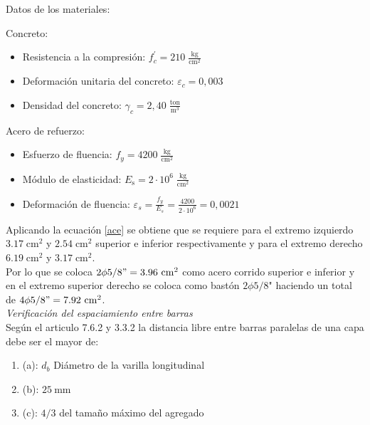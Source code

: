 Datos de los materiales:

Concreto:

\begin{itemize}
  \item Resistencia a la compresión: $\displaystyle f_{c}^{\prime}=210 \;\frac{\mathrm{kg}}{\mathrm{cm}^{2}}$

  \item Deformación unitaria del concreto: $\varepsilon_{c}=0,003$

  \item Densidad del concreto: $\displaystyle\gamma_{c}=2,40\;\frac{\mathrm{ ton }}{\mathrm{m}^{3}}$

\end{itemize}
\newpage
Acero de refuerzo:

\begin{itemize}
  \item Esfuerzo de fluencia: $\displaystyle f_{y}=4200\; \frac{\mathrm{kg}}{\mathrm{cm}^{2}}$

  \item Módulo de elasticidad: $\displaystyle E_{\mathrm{s}}=2 \cdot 10^{6} \;\frac{\mathrm{kg}}{\mathrm{cm}^{2}}$

  \item Deformación de fluencia: $\displaystyle \varepsilon_{s}=\frac{f_{y}}{E_{s}}=\frac{4200}{2 \cdot 10^{6}}=0,0021$

\end{itemize}
\noindent Aplicando la ecuación \ref{ace} se obtiene que se requiere para el extremo izquierdo $3.17\;{\mathrm{cm}^{2}}$ y $2.54\;{\mathrm{cm}^{2}}$ superior e inferior respectivamente y para el extremo derecho $6.19\;{\mathrm{cm}^{2}}$ y $3.17\;{\mathrm{cm}^{2}}$.\\
Por lo que se coloca $2 \phi 5 / 8"=3.96 \mathrm{~cm}^{2}$ como acero corrido superior e inferior y en el extremo superior derecho se coloca como bastón $2 \phi 5 / 8$" haciendo un total de $4 \phi 5 / 8"=7.92 \mathrm{~cm}^{2}$.\\
\textit{Verificación del espaciamiento entre barras}\\
Según el articulo 7.6.2 y 3.3.2 la distancia libre entre barras paralelas de una capa debe ser el mayor de:
\begin{enumerate}
\item[] (a): $d_{b}$ Diámetro de la varilla longitudinal
\item[] (b): $25 \mathrm{~mm}$
\item[] (c): $4/3$ del tamaño máximo del agregado
\end{enumerate}

